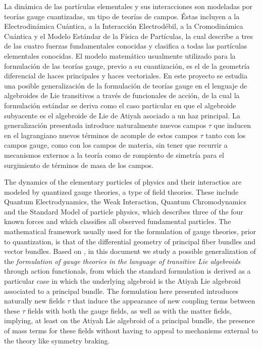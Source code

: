 La dinámica de las partículas elementales y sus interacciones son modeladas por teorías gauge cuantizadas, un tipo de teorías de campos. Éstas incluyen a la Electrodinámica Cuántica, a la Interacción Electrodébil, a la Cromodinámica Cuántica y el Modelo Estándar de la Física de Partículas, la cual describe a tres de las cuatro fuerzas fundamentales conocidas y clasifica a todas las partículas elementales conocidas. El modelo matemático usualmente utilizado para la formulación de las teorías gauge, previo a su cuantización, es el de la geometría diferencial de haces principales y haces vectoriales. En este proyecto se estudia una posible generalización de la formulación de teorías gauge en el lenguaje de algebroides de Lie transitivos a través de funcionales de acción, de la cual la formulación estándar se deriva como el caso particular en que el algebroide subyacente es el algebroide de Lie de Atiyah asociado a un haz principal. La generalización presentada introduce naturalmente nuevos campos $\tau$ que inducen en el lagrangiano nuevos términos de acomple de estos campos $\tau$ tanto con los campos gauge, como con los campos de materia, sin tener que recurrir a mecanismos externos a la teoría como de rompiento de simetría para el surgimiento de términos de masa de los campos.

The dynamics of the elementary particles of physics and their interactios are modeled by quantized gauge theories, a type of field theories. These include Quantum Electrodynamics, the Weak Interaction, Quantum Chromodynamics and the Standard Model of particle physics, which describes three of the four known forces and which classifies all observed fundamental particles. The mathematical framework usually used for the formulation of gauge theories, prior to quantization, is that of the differential geometry of principal fiber bundles and vector bundles. Based on \cite{Fournel2013, Francois2014, Fournel2011, Lazzarini2012}, in this document we study a possible generalization of the \textit{formulation of gauge theories in the language of transitive Lie algebroids} through action functionals, from which the standard formulation is derived as a particular case in which the underlying algebroid is the Atiyah Lie algebroid associated to a principal bundle. The formulation here presented introduces naturally new fields $\tau$ that induce the appearance of new coupling terms between these $\tau$ fields with both the gauge fields, as well as with the matter fields, implying, at least on the Atiyah Lie algebroid of a principal bundle, the presence of mass terms for these fields without having to appeal to mechanisms external to the theory like symmetry braking.


